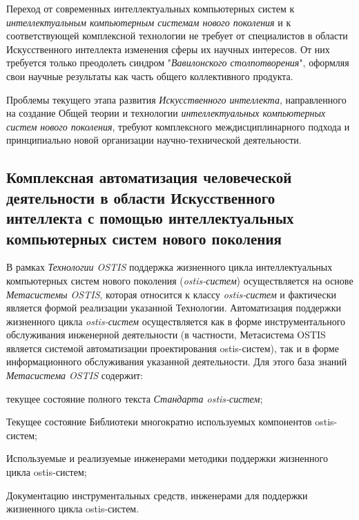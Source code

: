 Переход от современных интеллектуальных компьютерных систем к \textit{интеллектуальным компьютерным системам нового поколения} и к соответствующей комплексной технологии не требует от специалистов в области Искусственного интеллекта изменения сферы их научных интересов. От них требуется только преодолеть синдром "\textit{Вавилонского столпотворения}"{}, оформляя свои научные результаты как часть общего коллективного продукта.

Проблемы текущего этапа развития \textit{Искусственного интеллекта}, направленного на создание Общей теории и технологии \textit{интеллектуальных компьютерных систем нового поколения}, требуют  комплексного междисциплинарного подхода и принципиально новой организации научно-технической деятельности.

\subsection{Комплексная автоматизация человеческой деятельности в области Искусственного интеллекта с помощью интеллектуальных компьютерных систем нового поколения}
\label{subsec_integrated_automation_human_activity_field_AI_using_ICS}

В рамках \textit{Технологии OSTIS} поддержка жизненного цикла интеллектуальных компьютерных систем нового поколения (\textit{ostis-систем}) осуществляется на основе \textit{Метасистемы OSTIS}, которая относится к классу \textit{ostis-систем} и фактически является формой реализации указанной Технологии. Автоматизация поддержки жизненного цикла \textit{ostis-систем} осуществляется как в форме инструментального обслуживания инженерной деятельности (в частности, Метасистема OSTIS является системой автоматизации проектирования ostis-систем), так и в форме информационного обслуживания указанной деятельности. Для этого база знаний \textit{Метасистема OSTIS} содержит: 
\begin{textitemize}
	\item текущее состояние полного текста \textit{Стандарта ostis-систем};
	\item Текущее состояние Библиотеки многократно используемых компонентов ostis-систем;
	\item Используемые и реализуемые инженерами методики поддержки жизненного цикла ostis-систем;
	\item Документацию инструментальных средств, инженерами для поддержки жизненного цикла  ostis-систем.
\end{textitemize}

